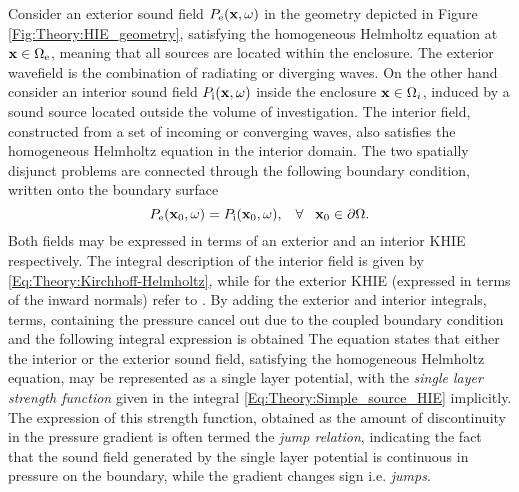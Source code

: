 Consider an exterior sound field $P_{\mathrm{e}}(\mathbf{x},\omega)$ in the geometry depicted in Figure \ref{Fig:Theory:HIE_geometry}, satisfying the homogeneous Helmholtz equation at $\mathbf{x} \in \Omega_{\mathrm{e}}$, meaning that all sources are located within the enclosure. 
The exterior wavefield is the combination of radiating or diverging waves. 
On the other hand consider an interior sound field $P_{\mathrm{i}}(\mathbf{x},\omega)$ inside the enclosure $\mathbf{x} \in \Omega_i$, induced by a sound source located outside the volume of investigation.
The interior field, constructed from a set of incoming or converging waves, also satisfies the homogeneous Helmholtz equation in the interior domain.
The two spatially disjunct problems are connected through the following boundary condition, written onto the boundary surface
\begin{equation}
P_{\mathrm{e}}(\mathbf{x}_0,\omega) = P_{\mathrm{i}}(\mathbf{x}_0,\omega), \hspace{3mm} \forall \hspace{3mm} \mathbf{x}_0 \in \partial \Omega.
\end{equation}
Both fields may be expressed in terms of an exterior and an interior KHIE respectively.
The integral description of the interior field is given by \eqref{Eq:Theory:Kirchhoff-Helmholtz}, while for the exterior KHIE (expressed in terms of the inward normals) refer to \cite[eq. 8.30]{Williams1999}.
By adding the exterior and interior integrals, terms, containing the pressure cancel out due to the coupled boundary condition and the following integral expression is obtained \cite{Courant1962, Kellogg1967, Williams1999}
The equation states that either the interior or the exterior sound field, satisfying the homogeneous Helmholtz equation, may be represented as a single layer potential, with the \emph{single layer strength function} given in the integral \eqref{Eq:Theory:Simple_source_HIE} implicitly.
The expression of this strength function, obtained as the amount of discontinuity in the pressure gradient is often termed the \emph{jump relation}, indicating the fact that the sound field generated by the single layer potential is continuous in pressure on the boundary, while the gradient changes sign i.e. \emph{jumps}.

